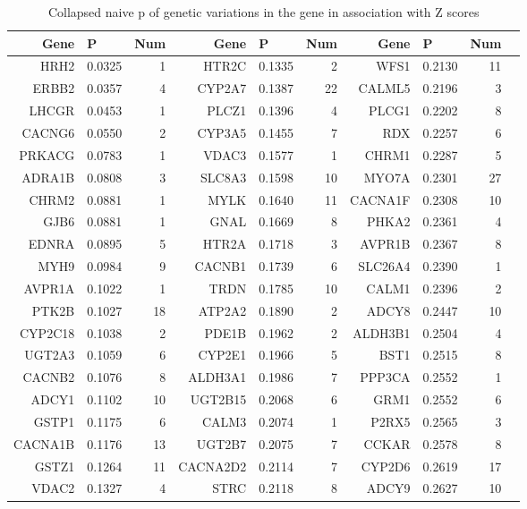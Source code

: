\documentclass{article}
\begin{document}
\begin{table}[tbp]
\centering
\caption{Collapsed naive p of genetic variations in the gene in association with Z scores} 
\label{tab:lowP}
{\small
\begin{tabular}{rlrrlrrlrr}
  \hline
Gene & P & Num & Gene & P & Num & Gene & P & Num \\ 
  \hline
HRH2 & 0.0325 & 1 & HTR2C & 0.1335 & 2 & WFS1 & 0.2130 & 11 \\ 
 ERBB2 & 0.0357 & 4 & CYP2A7 & 0.1387 & 22 & CALML5 & 0.2196 & 3 \\ 
LHCGR & 0.0453 & 1 & PLCZ1 & 0.1396 & 4 & PLCG1 & 0.2202 & 8 \\ 
CACNG6 & 0.0550 & 2 & CYP3A5 & 0.1455 & 7 & RDX & 0.2257 & 6 \\ 
PRKACG & 0.0783 & 1 & VDAC3 & 0.1577 & 1 & CHRM1 & 0.2287 & 5 \\ 
ADRA1B & 0.0808 & 3 & SLC8A3 & 0.1598 & 10 & MYO7A & 0.2301 & 27 \\ 
CHRM2 & 0.0881 & 1 & MYLK & 0.1640 & 11 & CACNA1F & 0.2308 & 10 \\ 
GJB6 & 0.0881 & 1 & GNAL & 0.1669 & 8 & PHKA2 & 0.2361 & 4 \\ 
 EDNRA & 0.0895 & 5 & HTR2A & 0.1718 & 3 & AVPR1B & 0.2367 & 8 \\ 
MYH9 & 0.0984 & 9 & CACNB1 & 0.1739 & 6 & SLC26A4 & 0.2390 & 1 \\ 
AVPR1A & 0.1022 & 1 & TRDN & 0.1785 & 10 & CALM1 & 0.2396 & 2 \\ 
 PTK2B & 0.1027 & 18 & ATP2A2 & 0.1890 & 2 & ADCY8 & 0.2447 & 10 \\ 
CYP2C18 & 0.1038 & 2 & PDE1B & 0.1962 & 2 & ALDH3B1 & 0.2504 & 4 \\ 
UGT2A3 & 0.1059 & 6 & CYP2E1 & 0.1966 & 5 & BST1 & 0.2515 & 8 \\ 
CACNB2 & 0.1076 & 8 & ALDH3A1 & 0.1986 & 7 & PPP3CA & 0.2552 & 1 \\ 
ADCY1 & 0.1102 & 10 & UGT2B15 & 0.2068 & 6 & GRM1 & 0.2552 & 6 \\ 
GSTP1 & 0.1175 & 6 & CALM3 & 0.2074 & 1 & P2RX5 & 0.2565 & 3 \\ 
CACNA1B & 0.1176 & 13 & UGT2B7 & 0.2075 & 7 & CCKAR & 0.2578 & 8 \\ 
GSTZ1 & 0.1264 & 11 & CACNA2D2 & 0.2114 & 7 & CYP2D6 & 0.2619 & 17 \\ 
VDAC2 & 0.1327 & 4 & STRC & 0.2118 & 8 & ADCY9 & 0.2627 & 10 \\ 
   \hline
\end{tabular}
}
\end{table}
\end{document}
